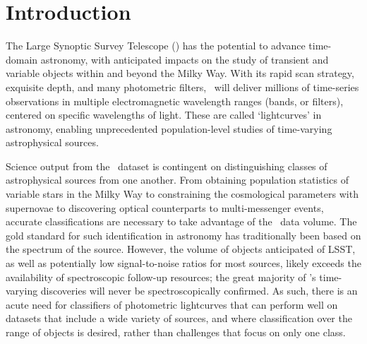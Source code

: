 \section{Introduction}
\label{sec:intro}

The Large Synoptic Survey Telescope (\lsst) has the potential to advance time-domain astronomy, with anticipated impacts on the study of transient and variable objects within and beyond the Milky Way.
With its rapid scan strategy, exquisite depth, and many photometric filters, \lsst\ will deliver millions of time-series observations in multiple electromagnetic wavelength ranges (bands, or filters), centered on specific wavelengths of light. These are called `lightcurves' in astronomy, enabling unprecedented population-level studies of time-varying astrophysical sources.

Science output from the \lsst\ dataset is contingent on distinguishing classes of astrophysical sources from one another.
From obtaining population statistics of variable stars in the Milky Way to constraining the cosmological parameters with supernovae to discovering optical counterparts to multi-messenger events, accurate classifications are necessary to take advantage of the \lsst\ data volume.
The gold standard for such identification in astronomy has traditionally been based on the spectrum of the source.
However, the volume of objects anticipated of LSST, as well as potentially low signal-to-noise ratios for most sources, likely exceeds the availability of spectroscopic follow-up resources; the great majority of \lsst's time-varying discoveries will never be spectroscopically confirmed.
As such, there is an acute need for classifiers of photometric lightcurves that can perform well on datasets that include a wide variety of sources, and where classification over the range of objects is desired, rather than challenges that focus on only one class.

